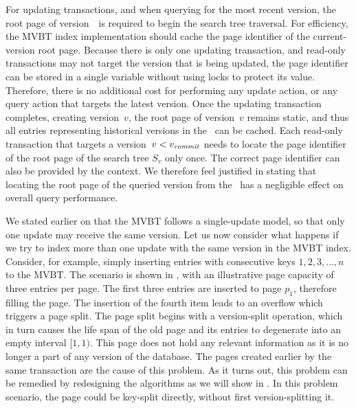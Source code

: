For updating transactions, and when querying for the most recent version, the
root page of version~\comver\ is required to begin the search tree
traversal.
For efficiency, the MVBT index implementation should cache the page
identifier of the current-version root page. 
Because there is only one updating transaction, and read-only transactions
may not target the version that is being updated, the page identifier can be
stored in a single variable without using locks to protect its value.
Therefore, there is no additional cost for performing any update action, or
any query action that targets the latest version.
Once the updating transaction completes, creating version~$v$, the root page
of version~$v$ remains static, and thus all entries representing
historical versions in the \rootstar\ can be cached.
Each read-only transaction that targets a version~$v < \smash{v_{\text{\textit{commit}}}}$
needs to locate the page identifier of the root page of the search
tree $S_v$ only once.
The correct page identifier can also be provided by the context.
We therefore feel justified in stating that locating the root
page of the queried version from the \rootstar\ has a negligible effect on
overall query performance.

We stated earlier on that the MVBT follows a single-update model, so that
only one update may receive the same version.
Let us now consider what happens if we try to index more than one update
with the same version in the MVBT index.
Consider, for example, simply inserting entries with consecutive keys
$1,2,3,\ldots,n$ to the MVBT\@.
The scenario is shown in , with an
illustrative page capacity of three entries per page.
The first three entries are inserted to page $p_1$, therefore filling the
page.
The insertion of the fourth item leads to an overflow which triggers
a page split.
The page split begins with a version-split operation, which in turn causes
the life span of the old page and its entries to degenerate into an empty
interval $[1,1)$.
This page does not hold any relevant information as it is no longer a part of
any version of the database. 
The pages created earlier by the same transaction are the cause of this
problem.
As it turns out, this problem can be remedied by redesigning the algorithms
as we will show in .
In this problem scenario, the page could be key-split directly, without first
version-splitting it.

\begin{figure}[htb]
\begin{center}
  
  \label{fig:mvbt-invalid-split}
\end{center}
\end{figure}

